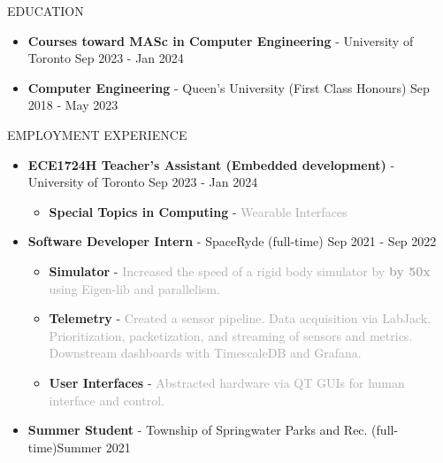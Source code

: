 \documentclass{resume} %
\begin{document}
\begin{rSection}{EDUCATION}
    \begin{itemize}
        \item {\bf Courses toward MASc in Computer Engineering} - University of Toronto \hfill {Sep 2023 - Jan 2024}
    \end{itemize}
    \begin{itemize}
        \item {\bf Computer Engineering} - Queen's University (First Class Honours) \hfill {Sep 2018 - May 2023}
    \end{itemize}
\end{rSection}

\begin{rSection}{EMPLOYMENT EXPERIENCE}
    \begin{itemize}
        \item {\bf ECE1724H Teacher's Assistant (Embedded development)} - University of Toronto \hfill {Sep 2023 - Jan 2024}
        \begin{itemize}[topsep=-10pt]
            \setlength\itemsep{-0.5em}
                \item[\textbullet] {\bf Special Topics in Computing} - \textcolor{darkgray}{Wearable Interfaces}
            \end{itemize}
        \item {\bf Software Developer Intern} - SpaceRyde (full-time) \hfill {Sep 2021 - Sep 2022}
        \begin{itemize}[topsep=-10pt]
            \setlength\itemsep{-0.5em}
            \item[\textbullet] {\bf Simulator} - \textcolor{darkgray}{Increased the speed of a rigid body simulator by \textbf{by 50x} using Eigen-lib and parallelism.}
            \item[\textbullet] {\bf Telemetry} - \textcolor{darkgray}{Created a sensor pipeline. Data acquisition via LabJack. Prioritization, packetization, and streaming of sensors and metrics. Downstream dashboards with TimescaleDB and Grafana.}
            \item[\textbullet] {\bf User Interfaces} - \textcolor{darkgray}{Abstracted hardware via QT GUIs for human interface and control.}
        \end{itemize}
        \item {\bf Summer Student} - Township of Springwater Parks and Rec. (full-time)\hfill {Summer 2021}
        \begin{itemize}[topsep=-10pt]
            \setlength\itemsep{-0.5em}

\end{itemize}
\end{itemize}
\end{rSection}
\end{document}
